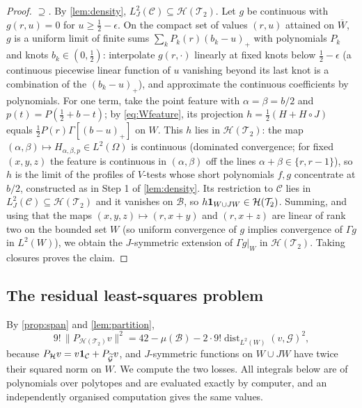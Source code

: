 \documentclass[11pt,colorlinks]{charlie}
\newcommand{\Om}{\Omega}
\begin{document}
\begin{proof}
\emph{$\supseteq$.} By \cref{lem:density}, $L^2_J(\mathcal C)\subseteq\mathcal H(\mathcal T_2)$. Let $g$ be continuous with $g(r,u)=0$ for $u\ge\frac12-\epsilon$. On the compact set of values $(r,u)$ attained on $\overline W$, $g$ is a uniform limit of finite sums $\sum_kP_k(r)(b_k-u)_+$ with polynomials $P_k$ and knots $b_k\in(0,\frac12)$: interpolate $g(r,\cdot)$ linearly at fixed knots below $\frac12-\epsilon$ (a continuous piecewise linear function of $u$ vanishing beyond its last knot is a combination of the $(b_k-u)_+$), and approximate the continuous coefficients by polynomials. For one term, take the point feature with $\alpha=\beta=b/2$ and $p(t)=P(\frac12+b-t)$; by \eqref{eq:Wfeature}, its projection $h=\frac12(H+H\circ J)$ equals $\frac12P(r)\Gamma[(b-u)_+]$ on $W$. This $h$ lies in $\mathcal H(\mathcal T_2)$: the map $(\alpha,\beta)\mapsto H_{\alpha,\beta,p}\in L^2(\Om)$ is continuous (dominated convergence; for fixed $(x,y,z)$ the feature is continuous in $(\alpha,\beta)$ off the lines $\alpha+\beta\in\{r,r-1\}$), so $h$ is the limit of the profiles of $V$-tests whose short polynomials $f,g$ concentrate at $b/2$, constructed as in Step 1 of \cref{lem:density}. Its restriction to $\mathcal C$ lies in $L^2_J(\mathcal C)\subseteq\mathcal H(\mathcal T_2)$ and it vanishes on $\mathcal B$, so $h\mathbf{1}_{W\cup JW}\in\mathcal H(\mathcal T_2)$. Summing, and using that the maps $(x,y,z)\mapsto(r,x+y)$ and $(r,x+z)$ are linear of rank two on the bounded set $W$ (so uniform convergence of $g$ implies convergence of $\Gamma g$ in $L^2(W)$), we obtain the $J$-symmetric extension of $\Gamma g|_W$ in $\mathcal H(\mathcal T_2)$. Taking closures proves the claim.
\end{proof}

\subsection{The residual least-squares problem}
By \cref{prop:span} and \cref{lem:partition},
\begin{equation}\label{eq:threelosses}
 9!\,\|P_{\mathcal H(\mathcal T_2)}v\|^2=42-\mu(\mathcal B)-2\cdot9!\operatorname{dist}_{L^2(W)}(v,\mathcal G)^2,
\end{equation}
because $P_{\mathcal H}v=v\mathbf{1}_{\mathcal C}+P_{\widetilde{\mathcal G}}v$, and $J$-symmetric functions on $W\cup JW$ have twice their squared norm on $W$. We compute the two losses. All integrals below are of polynomials over polytopes and are evaluated exactly by computer, and an independently organised computation gives the same values.
\end{document}
